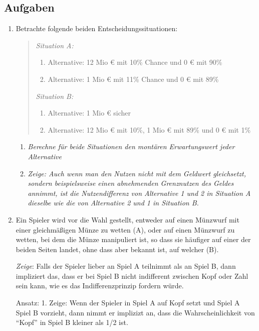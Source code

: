 \subsection{Aufgaben}

\begin{enumerate}
  \item Betrachte folgende beiden Entscheidungssituationen: 
\begin{quote}
{\em Situation A:}
\begin{enumerate}
  \item Alternative: 12 Mio € mit 10\% Chance und 0 € mit 90\%
  \item Alternative: 1 Mio € mit 11\% Chance und 0 € mit 89\%
\end{enumerate}

{\em Situation B:}
\begin{enumerate}
  \item Alternative: 1 Mio € sicher
  \item Alternative: 12 Mio € mit 10\%, 1 Mio € mit 89\% und 0 € mit 1\% 
\end{enumerate}
\end{quote}
  \begin{enumerate}
    \item {\em Berechne für beide Situationen den montären Erwartungswert jeder
    Alternative}
    \item {\em Zeige: Auch wenn man den Nutzen nicht mit dem Geldwert
    gleichsetzt, sondern beispielsweise einen abnehmenden Grenznutzen des
    Geldes annimmt, ist die Nutzendifferenz von Alternative 1 und 2 in
    Situation A dieselbe wie die von Alternative 2 und 1 in Situation B.}
  \end{enumerate}

  \item Ein Spieler wird vor die Wahl gestellt, entweder auf einen Münzwurf mit
  einer gleichmäßigen Münze zu wetten (A), oder auf einen Münzwurf zu wetten, bei
  dem die Münze manipuliert ist, so dass sie häufiger auf einer der beiden Seiten
  landet, ohne dass aber bekannt ist, auf welcher (B). \cite[S. 109]{resnik:1987}
  
  {\em Zeige}: Falls der Spieler lieber an Spiel A teilnimmt als an Spiel B, dann
  impliziert das, dass er bei Spiel B nicht indifferent zwischen Kopf oder Zahl
  sein kann, wie es das Indifferenzprinzip fordern würde.
  
  Ansatz: 1. Zeige: Wenn der Spieler in Spiel A auf Kopf setzt und Spiel A Spiel
  B vorzieht, dann nimmt er implizizt an, dass die Wahrscheinlichkeit von
  "`Kopf"' in Spiel B kleiner als 1/2 ist.
  

\end{enumerate}
